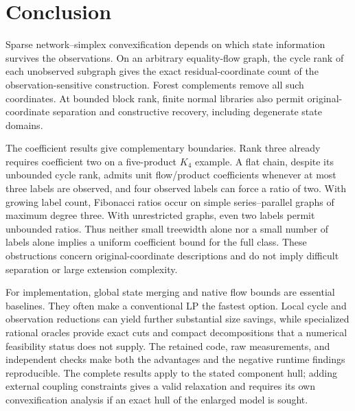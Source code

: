 \section{Conclusion}\label{sec:conclusion}
Sparse network--simplex convexification depends on which state information
survives the observations. On an arbitrary equality-flow graph, the cycle
rank of each unobserved subgraph gives the exact residual-coordinate count
of the observation-sensitive construction. Forest complements remove all
such coordinates. At bounded block rank, finite normal libraries also
permit original-coordinate separation and constructive recovery, including
degenerate state domains.

The coefficient results give complementary boundaries. Rank three already
requires coefficient two on a five-product $K_4$ example. A flat chain,
despite its unbounded cycle rank, admits unit flow/product coefficients
whenever at most three labels are observed, and four observed labels can
force a ratio of two. With growing label count, Fibonacci ratios occur on
simple series--parallel graphs of maximum degree three. With unrestricted
graphs, even two labels permit unbounded ratios.
Thus neither small treewidth alone nor a small number of labels alone
implies a uniform coefficient bound for the full class. These obstructions
concern original-coordinate descriptions and do not imply difficult
separation or large extension complexity.

For implementation, global state merging and native flow bounds are essential
baselines. They often make a conventional LP the fastest option. Local cycle
and observation reductions can yield further substantial size savings, while
specialized rational oracles provide exact cuts and compact decompositions
that a numerical feasibility status does not supply. The retained code,
raw measurements, and independent checks make both the advantages and the
negative runtime findings reproducible. The complete results apply to the
stated component hull; adding external coupling constraints gives a valid
relaxation and requires its own convexification analysis if an exact hull
of the enlarged model is sought.
